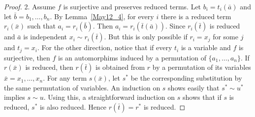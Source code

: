 \documentclass[a4paper, 11pt]{article}
\theoremstyle{note}
\begin{document}
\begin{proof}
	2. Assume $f$ is surjective and preserves reduced terms. Let $b_i=t_i(\bar{a})$  and let $\bar{b}=b_1,\ldots,b_n$.  By Lemma~\ref{May12_4}, for every $i$ there is a reduced term $r_i(\bar{x})$ such that $a_i=r_i(\bar{b})$. Then $a_i= r_i(\bar{t}(\bar{a}))$. Since $r_i(\bar{t})$ is reduced and $\bar{a}$ is independent $x_i\sim r_i(\bar{t})$.  But this is only possible if $r_i=x_j$ for some $j$ and  $t_j=x_i$.  For the other direction, notice that if every $t_i$ is a variable and $f$ is surjective, then $f$ is an automorphims induced by a permutation of $\{a_1,\ldots,a_n\}$. If $r(\bar{x})$ is reduced, then $r(\bar{t})$ is obtained from $r$ by a permutation of its variables $\bar{x}=x_1,\ldots,x_n$. For any term $s(\bar{x})$, let $s^\ast$ be the corresponding substitution by the same permutation of variables. An induction on $s$ shows easily that $s^\ast\sim u^\ast$ implies $s\sim u$. Using this, a straightforward induction on $s$ shows that if $s$ is reduced, $s^\ast$ is also reduced. Hence $r(\bar{t}) =r^\ast$ is reduced.
\end{proof}
\end{document}
